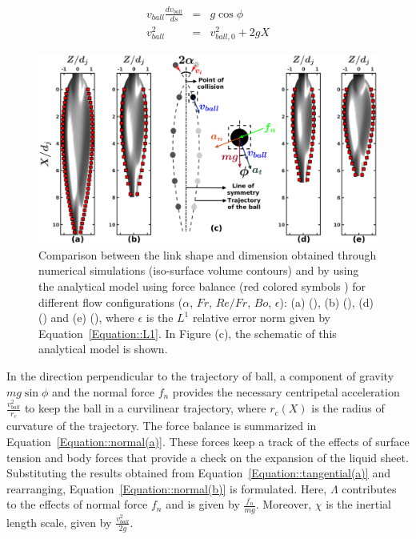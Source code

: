 \documentclass[%
aip,
sd,%
amsmath,amssymb,
preprint,%
author-year,%
]{revtex4-1}
\begin{document}
\begin{subequations}
	\label{Equation::Tangential}
	\begin{eqnarray}
	\label{Equation::tangential(a)}
	v_{ball}\frac{dv_{ball}}{ds} &=& g\cos\phi\\
	v_{ball}^2 &=& v_{ball,0}^2 + 2gX
	\label{Equation::tangential(b)}
	\end{eqnarray}
\end{subequations}
\begin{figure}
	\centering
	\includegraphics[width=\linewidth]{analytical}
	\caption{Comparison between the link shape and dimension obtained through numerical simulations (iso-surface volume contours) and by using the analytical model using force balance (red colored symbols \protect\MarkerSquareRed) for different flow configurations ($\alpha$, $Fr$, $Re/Fr$, $Bo$, $\epsilon$): (a) (), (b) (), (d) () and (e) (), where $\epsilon$ is the $L^1$ relative error norm given by Equation~\ref{Equation::L1}. In Figure (c), the schematic of this analytical model is shown.}
	\label{Figure::analytical}
\end{figure}
In the direction perpendicular to the trajectory of ball, a component of gravity $mg\sin\phi$ and the normal force $f_n$ provides the necessary centripetal acceleration $\frac{v_{ball}^2}{r_c}$ to keep the ball in a curvilinear trajectory, where $r_c(X)$ is the radius of curvature of the trajectory. The force balance is summarized in Equation~\ref{Equation::normal(a)}. These forces keep a track of the effects of surface tension and body forces that provide a check on the expansion of the liquid sheet. Substituting the results obtained from Equation~\ref{Equation::tangential(a)} and rearranging, Equation~\ref{Equation::normal(b)} is formulated. Here, $\Lambda$ contributes to the effects of normal force $f_n$ and is given by $\frac{f_n}{mg}$. Moreover, $\chi$ is the inertial length scale, given by $\frac{v_{ball}^2}{2g}$.
\end{document}
